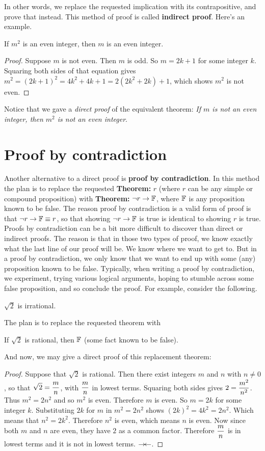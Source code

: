 In other words, we replace the requested
implication with its contrapositive, and prove that instead. This method of
proof is called {\bfseries indirect proof}. Here's an example.
\begin{thm}
If $m^2$ is an even integer, then $m$ is an even integer. 
\end{thm}
\begin{proof}
 Suppose $m$ is not even. Then $m$ is odd. So
 $m=2k+1$ for some integer $k$. Squaring both sides of that equation gives
 $m^2 = (2k+1)^2 = 4k^2+4k+1 = 2(2k^2+2k) + 1$, which shows $m^2$ is not even.
\end{proof}

Notice that we gave a {\itshape direct proof} of the equivalent theorem:
{\itshape  If $m$ is not an even integer, then $m^2$ is not an 
even integer}.

\section{Proof by contradiction}
Another alternative to a direct proof is {\bfseries proof by contradiction}. 
In this method the plan is to replace the requested {\bfseries Theorem:} $r$ (where
$r$ can be any simple or compound proposition) with 
{\bfseries Theorem:} $\neg r \to \mathbb{F}$, where $\mathbb{F}$ is any proposition known to be false.
The reason proof by contradiction is a valid form of proof is that
$\neg r \to \mathbb{F}\equiv r$, so that showing  $\neg r \to \mathbb{F}$ is true is identical
to showing $r$ is true. Proofs by contradiction can be a bit more difficult to
discover than direct or indirect proofs. The reason is that in those two types of
proof, we know exactly what the last line of our proof will be. We know where we
want to get to. But in a proof by contradiction, we only know that we want to
end up with some (any) proposition known to be false. Typically, when writing a
proof by contradiction, we experiment, trying various logical arguments, hoping
to stumble across some false proposition, and so conclude the proof. For example,
consider the following.
\begin{thm}
 $\sqrt{2}$ is irrational.
\end{thm}
\noindent The plan is to replace the requested theorem with 
\begin{thm}
 If $\sqrt{2}$
 is rational, then $\mathbb{F}$ (some fact known to be false).
\end{thm}
\noindent And now, we may give a direct proof of this replacement theorem:

\begin{proof}
Suppose that $\sqrt{2}$ is rational. Then there exist integers 
$m$ and $n$
with $n\neq 0$,  so that $\displaystyle{\sqrt{2}={m\over n}}$, with $\displaystyle{m\over n}$ in 
lowest terms. Squaring both sides
gives $\displaystyle{2={m^2\over n^2}}$. Thus
$m^2=2n^2$ and so $m^2$ is even. Therefore $m$ is even.
So $m=2k$ for some integer $k$. Substituting $2k$ for $m$ in $m^2=2n^2$
shows  $(2k)^2=4k^2=2n^2$. Which means that $n^2=2k^2$.
Therefore $n^2$ is even, which means  $n$ is even. 
Now since both $m$ and $n$ are even, they
have $2$ as a common factor. Therefore $\displaystyle{m\over n}$ is in lowest terms and
it is not in lowest terms. $\rightarrow \!\leftarrow$.
\end{proof}

